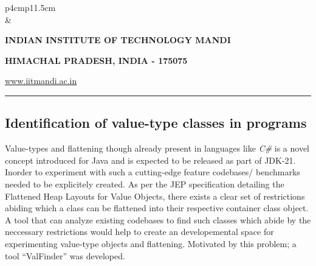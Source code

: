 \documentclass[12 pt, a4paper]{article}
\newcommand{\HRule}{\rule{\linewidth}{1mm}}
\begin{document}
\pagestyle{empty}
\vskip 0.2cm
	\begin{tabular}{p{4cm}p{11.5cm}}
		  \\
		& \centering \large\bf\phantom{Empty line}\\ 
		\rule{0pt}{1pt} \centering \large\bf{INDIAN INSTITUTE OF TECHNOLOGY MANDI} \\
		\rule{0pt}{1pt} \centering \large\bf{HIMACHAL PRADESH, INDIA - 175075} \\
		\rule{0pt}{1pt} \centering \underline{\href{www.iitmandi.ac.in}{www.iitmandi.ac.in}}\\
	\end{tabular}
\noindent

{\raggedleft{}\HRule}

\subsection{Identification of value-type classes in programs}
Value-types and flattening though already present in languages like {\em C\#} is a novel concept 
introduced for Java and is expected to be released as part of 
JDK-21. Inorder to experiment with such a cutting-edge feature 
codebases/ benchmarks needed to be explicitely created. 
As per the JEP specification \citep{JEPP} 
detailing the Flattened Heap Layouts for Value Objects,  
there exists a clear set of restrictions abiding which a class
can be flattened into their respective container class object.
A tool that can analyze existing codebases to find such classes which abide
by the neccessary restrictions would help to
create an developemental space for experimenting value-type objects and flattening.
 Motivated by this problem; a tool ``ValFinder'' was 
developed.
	
\end{document}
